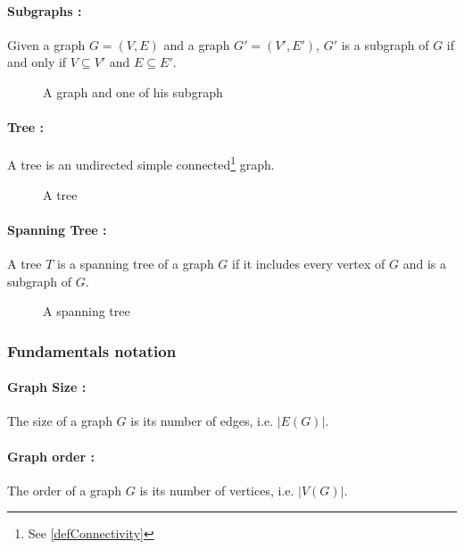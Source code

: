 \paragraph{Subgraphs :}
Given a graph $G = (V,E)$ and a graph $G' = (V',E')$, $G'$ is a subgraph of $G$ 
if and only if $V \subseteq V'$ and $E \subseteq E'$.

\begin{figure}[!h]
  \begin{center}
    
  \end{center}
  \caption{A graph and one of his subgraph}
\end{figure}

\paragraph{Tree :}
A tree is an undirected simple connected\footnote{See \ref{defConnectivity}}
graph.

\begin{figure}[!h]
  \begin{center}
    
  \end{center}
  \caption{A tree}
\end{figure}

\paragraph{Spanning Tree :}
A tree $T$ is a spanning tree of a graph $G$ if it includes every vertex of $G$ 
and is a subgraph of $G$.

\begin{figure}[!h]
  \begin{center}
    
  \end{center}
  \caption{A spanning tree}
\end{figure}

\subsubsection{Fundamentals notation}
\paragraph{Graph Size :}
The size of a graph $G$ is its number of edges, i.e. $|E(G)|$.

\paragraph{Graph order :}
The order of a graph $G$ is its number of vertices, i.e. $|V(G)|$.

